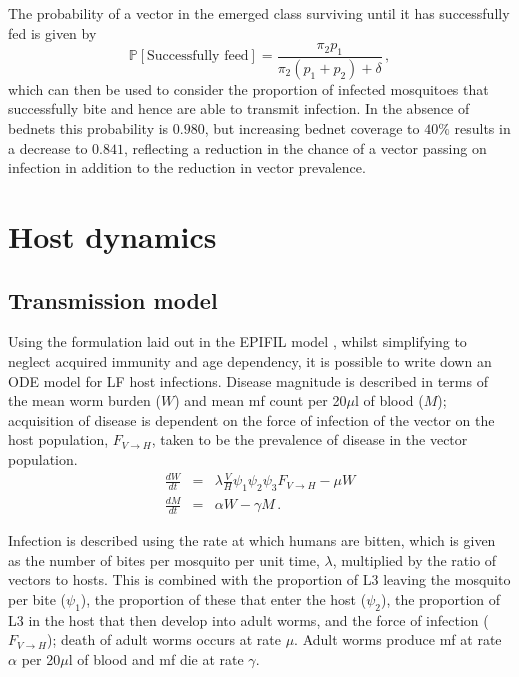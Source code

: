 \documentclass[5p,times]{elsarticle}
\begin{document}
The probability of a vector in the emerged class surviving until it has successfully fed is given by
\begin{equation}
\mathbb{P}[\mbox{Successfully feed}] = \frac{\pi_2p_1}{\pi_2(p_1+p_2)+\delta}\,,
\end{equation}
which can then be used to consider the proportion of infected mosquitoes that successfully bite and hence are able to transmit infection. In the absence of bednets this probability is $0.980$, but increasing bednet coverage to $40\%$ results in a decrease to $0.841$, reflecting a reduction in the chance of a vector passing on infection in addition to the reduction in vector prevalence. 

\section{Host dynamics}

\subsection{Transmission model}

Using the formulation laid out in the EPIFIL model \cite{norman2000}, whilst simplifying to neglect acquired immunity and age dependency, it is possible to write down an ODE model for LF host infections. Disease magnitude is described in terms of the mean worm burden ($W$) and mean mf count per 20$\mu$l of blood ($M$); acquisition of disease is dependent on the force of infection of the vector on the host population, $F_{V\rightarrow H}$, taken to be the prevalence of disease in the vector population.
\begin{eqnarray}
\frac{dW}{dt} &=& \lambda\frac{V}{H}\psi_1\psi_2\psi_3F_{V\rightarrow H} - \mu W\\
\frac{dM}{dt} &=& \alpha W - \gamma M \,.
\end{eqnarray}

Infection is described using the rate at which humans are bitten, which is given as the number of bites per mosquito per unit time, $\lambda$, multiplied by the ratio of vectors to hosts. This is combined with the proportion of L3 leaving the mosquito per bite ($\psi_1$), the proportion of these that enter the host ($\psi_2$), the proportion of L3 in the host that then develop into adult worms, and the force of infection ($F_{V\rightarrow H}$); death of adult worms occurs at rate $\mu$. Adult worms produce mf at rate $\alpha$ per 20$\mu$l of blood and mf die at rate $\gamma$.
\end{document}
